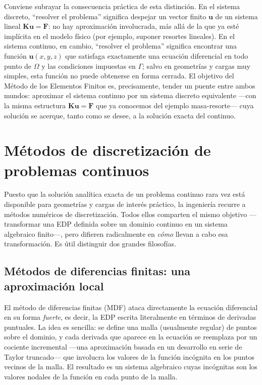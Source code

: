 Conviene subrayar la consecuencia práctica de esta distinción. En el sistema discreto, ``resolver el problema'' significa despejar un vector finito $\mathbf{u}$ de un sistema lineal $\mathbf{K}\mathbf{u}=\mathbf{F}$: no hay aproximación involucrada, más allá de la que ya esté implícita en el modelo físico (por ejemplo, suponer resortes lineales). En el sistema continuo, en cambio, ``resolver el problema'' significa encontrar una función $\bm{u}(x,y,z)$ que satisfaga exactamente una ecuación diferencial en todo punto de $\Omega$ y las condiciones impuestas en $\Gamma$; salvo en geometrías y cargas muy simples, esta función no puede obtenerse en forma cerrada. El objetivo del Método de los Elementos Finitos es, precisamente, tender un puente entre ambos mundos: aproximar el sistema continuo por un sistema discreto equivalente —con la misma estructura $\mathbf{K}\mathbf{u}=\mathbf{F}$ que ya conocemos del ejemplo masa-resorte— cuya solución se acerque, tanto como se desee, a la solución exacta del continuo.

\section{Métodos de discretización de problemas continuos}
\label{sec:cap01-metodos-discretizacion}

Puesto que la solución analítica exacta de un problema continuo rara vez está disponible para geometrías y cargas de interés práctico, la ingeniería recurre a métodos numéricos de discretización. Todos ellos comparten el mismo objetivo —transformar una EDP definida sobre un dominio continuo en un sistema algebraico finito—, pero difieren radicalmente en \emph{cómo} llevan a cabo esa transformación. Es útil distinguir dos grandes filosofías.

\subsection{Métodos de diferencias finitas: una aproximación local}
\label{sec:cap01-diferencias-finitas}

El método de diferencias finitas (MDF) ataca directamente la ecuación diferencial en su forma \emph{fuerte}, es decir, la EDP escrita literalmente en términos de derivadas puntuales. La idea es sencilla: se define una malla (usualmente regular) de puntos sobre el dominio, y cada derivada que aparece en la ecuación se reemplaza por un cociente incremental —una aproximación basada en un desarrollo en serie de Taylor truncado— que involucra los valores de la función incógnita en los puntos vecinos de la malla. El resultado es un sistema algebraico cuyas incógnitas son los valores nodales de la función en cada punto de la malla.

